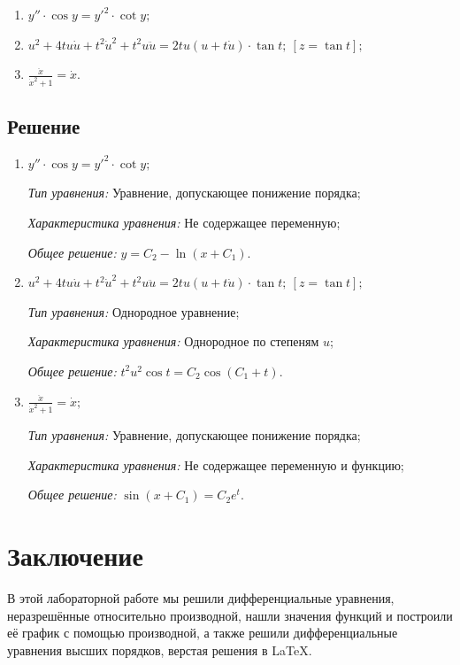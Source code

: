 \documentclass[14pt, a4paper, titlepage, fleqn]{extarticle}
\begin{document}
            \begin{enumerate}
                \item \( y'' \cdot \cos{y} = y'^2 \cdot \cot{y}; \)
                \item \( u^2 + 4tu \dot{u} + t^2 \dot{u}^2 + t^2 u \ddot{u} = 2tu \left( u + t \dot{u} \right) \cdot \tan{t}; ~ [z = \tan{t}]; \)
                \item \( \frac{\ddot{x}}{\dot{x}^2 + 1} = \dot{x}. \)
            \end{enumerate}

        
        \subsection{Решение}
            \begin{enumerate}
                \item \( y'' \cdot \cos{y} = y'^2 \cdot \cot{y}; \)
                    
                    \textit{Тип уравнения:} 
                        Уравнение, допускающее понижение порядка;

                    \textit{Характеристика уравнения:}
                        Не содержащее переменную;

                    \textit{Общее решение:} \( y = C_2 - \ln \left(x + C_1\right). \)

                \item \( u^2 + 4tu \dot{u} + t^2 \dot{u}^2 + t^2 u \ddot{u} = 2tu \left( u + t \dot{u} \right) \cdot \tan{t}; ~ [z = \tan{t}]; \)
                
                    \textit{Тип уравнения:} 
                        Однородное уравнение;

                    \textit{Характеристика уравнения:}
                        Однородное по степеням \(u\);

                    \textit{Общее решение:} \( t^2u^2 \cos{t} = C_2 \cos\left( C_1 + t \right) . \)

                \item \( \frac{\ddot{x}}{\dot{x}^2 + 1} = \dot{x}; \)
                
                    \textit{Тип уравнения:} 
                    Уравнение, допускающее понижение порядка;

                    \textit{Характеристика уравнения:}
                        Не содержащее переменную и функцию;

                    \textit{Общее решение:} \( \sin \left( x + C_1 \right) = C_2 e^t. \)
                    


            \end{enumerate}


    \section{Заключение}
        В этой лабораторной работе мы решили дифференциальные 
        уравнения, неразрешённые относительно производной, нашли значения
        функций и построили её график с помощью производной, 
        а также решили дифференциальные уравнения высших
        порядков, верстая решения в \LaTeX.
\end{document}
